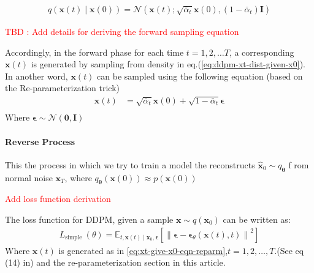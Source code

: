 \documentclass[11pt]{article}
\begin{document}
    \begin{equation}
        \label{eq:ddpm-xt-dist-given-x0}
        \begin{aligned}
            q\left(\mathbf{x}(t) \mid \mathbf{x}(0)\right)=\mathcal{N}\left(\mathbf{x}(t) ;
            \sqrt{\bar{\alpha}_t} \mathbf{x}(0),\left(1-\bar{\alpha}_t\right) \mathbf{I}\right)
        \end{aligned}
    \end{equation}


    \textcolor{red}{TBD : Add details for deriving the forward sampling equation}


    Accordingly, in the forward phase for each time $t=1,2,\dots T$, a corresponding $\mathbf{x}(t)$ is generated by
    sampling from density in eq.(\ref{eq:ddpm-xt-dist-given-x0}). In another word, $\mathbf{x}(t)$ can be sampled using
    the following equation (based on the Re-parameterization trick\cite{kingma2022autoencoding,TheRepar23:online})
    \begin{equation}
        \label{eq:xt-give-x0-eqn-reparm}
        \begin{aligned}
            \mathbf{x}(t) &=\sqrt{\bar{\alpha}_t} \mathbf{x}(0)+\sqrt{1-\bar{\alpha}_t} \boldsymbol{\epsilon}\\
        \end{aligned}
    \end{equation}
    Where $\bm{\epsilon} \sim \mathcal{N}(\mathbf{0},\mathbf{I})$

    \paragraph{Reverse Process}
    This the process in which we try to train a model the reconstructs $\hat{\mathbf{x}}_0 \sim q_{\bm{\theta}}$ f
    rom normal noise $\mathbf{x}_T$, where $q_{\bm{\theta}}(\mathbf{x}(0)) \approx p(\mathbf{x}(0))$

    \newline
    \textcolor{red}{Add loss function derivation}
    \newline

    The loss function for DDPM, given a sample $\mathbf{x} \sim q(\mathbf{x}_0)$ can be written as:
    \begin{equation}
        \begin{aligned}
            L_{\text {simple }}(\theta) =\mathbb{E}_{t,\mathbf{x}(t) \mid \mathbf{x}_0,
            \boldsymbol{\epsilon}}\left[\left\|\boldsymbol{\epsilon}-\boldsymbol{\epsilon}_
            \theta\left(\mathbf{x}(t), t\right)\right\|^2\right]
        \end{aligned}
        \label{eq:ddpm-loss-simple}
    \end{equation}
    Where $\mathbf{x}(t)$ is generated as in \eqref{eq:xt-give-x0-eqn-reparm},$t=1,2,\dots,T$.(See eq (14)
    in\cite{ho2020denoising}) and the re-parameterization section in this article\cite{WhatareD38:online}.\par
\end{document}

